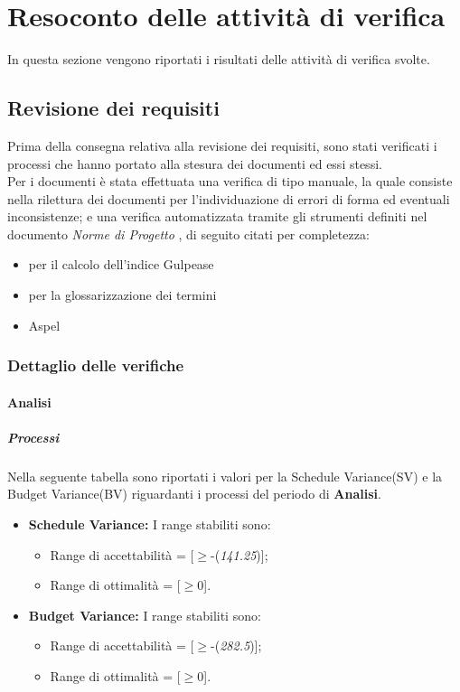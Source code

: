 \section{Resoconto delle attività di verifica}
  In questa sezione vengono riportati i risultati delle attività di verifica svolte.
  \subsection{Revisione dei requisiti}
  Prima della consegna relativa alla revisione dei requisiti, sono stati verificati i processi che hanno portato alla stesura dei documenti ed essi stessi. \\
  Per i documenti è stata effettuata una verifica di tipo manuale, la quale consiste nella rilettura dei documenti per l'individuazione di errori di forma ed eventuali inconsistenze;
  e una verifica automatizzata tramite gli strumenti definiti nel documento \emph{Norme di Progetto \VersioneNP{}}, di seguito citati per completezza:
  \begin{itemize}
    \item {}  per il calcolo dell’indice Gulpease
    \item {}  per la glossarizzazione dei termini
    \item Aspel
  \end{itemize}
  \subsubsection{Dettaglio delle verifiche}
    \paragraph{Analisi}
      \subparagraph{Processi}
      Nella seguente tabella sono riportati i valori per la Schedule Variance(SV) e la Budget Variance(BV) riguardanti i processi del periodo di \textbf{Analisi}.\\
      \begin{itemize}
      \item \textbf{Schedule Variance:} I range stabiliti sono:
      \begin{itemize}
        \item Range di accettabilità = [\(\geq\)-(\emph{141.25})];
        \item Range di ottimalità = [\(\geq\)0].
      \end{itemize}
      
      \item \textbf{Budget Variance:} I range stabiliti sono:
      \begin{itemize}
        \item Range di accettabilità = [\(\geq\)-(\emph{282.5})];
        \item Range di ottimalità = [\(\geq\)0].
      \end{itemize}
      
      
      \end{itemize}
     
